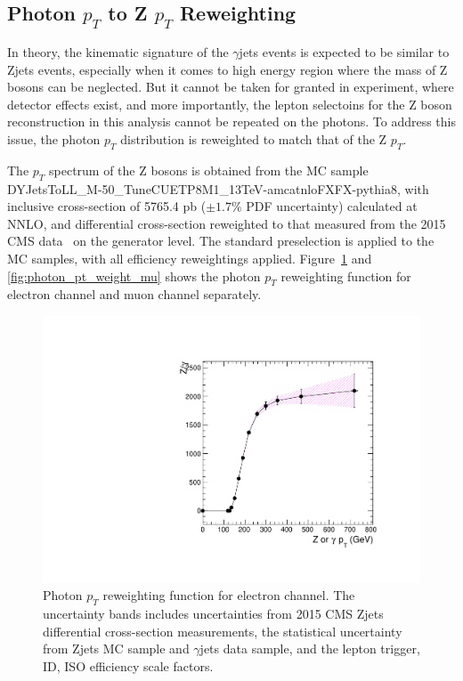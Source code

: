 \subsection{Photon $p_T$ to Z $p_T$ Reweighting}
In theory, the kinematic signature of the $\gamma$jets events is expected to be similar to Zjets events, especially when it comes to high energy region where the mass of Z bosons can be neglected. But it cannot be taken for granted in experiment, where detector effects exist, and more importantly, the lepton selectoins for the Z boson reconstruction in this analysis cannot be repeated on the photons. To address this issue, the photon $p_T$ distribution is reweighted to match that of the Z $p_T$. 

\vspace{0.3cm}
The $p_T$ spectrum of the Z bosons is obtained from the MC sample DYJetsToLL\_M-50\_TuneCUETP8M1\_13TeV-amcatnloFXFX-pythia8, with inclusive cross-section of 5765.4 pb ($\pm 1.7\%$ PDF uncertainty) calculated at NNLO, and differential cross-section reweighted to that measured from the 2015 CMS data~\cite{bg_2015zjetxsec} on the generator level. The standard preselection is applied to the MC samples, with all efficiency reweightings applied. Figure~\ref{fig:photon_pt_weight_el} and \ref{fig:photon_pt_weight_mu} shows the photon $p_T$ reweighting function for electron channel and muon channel separately. 

\begin{figure}[htbp]
\centering
  \includegraphics[width=0.9\linewidth]{figures/study_gjets_data_allcorV2_modify_el.pdf}
  \caption{Photon $p_T$ reweighting function for electron channel.
 The uncertainty bands includes uncertainties from 2015 CMS Zjets differential cross-section measurements, the statistical uncertainty from Zjets MC sample and $\gamma$jets data sample, and the lepton trigger, ID, ISO efficiency scale factors.}
  \label{fig:photon_pt_weight_el}
\end{figure}

